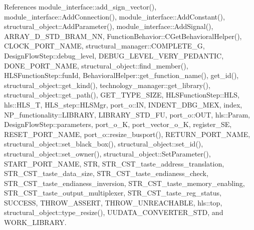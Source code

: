 References module\+\_\+interface\+::add\+\_\+sign\+\_\+vector(), module\+\_\+interface\+::\+Add\+Connection(), module\+\_\+interface\+::\+Add\+Constant(), structural\+\_\+object\+::\+Add\+Parameter(), module\+\_\+interface\+::\+Add\+Signal(), A\+R\+R\+A\+Y\+\_\+D\+\_\+\+S\+T\+D\+\_\+\+B\+R\+A\+M\+\_\+\+NN, Function\+Behavior\+::\+C\+Get\+Behavioral\+Helper(), C\+L\+O\+C\+K\+\_\+\+P\+O\+R\+T\+\_\+\+N\+A\+ME, structural\+\_\+manager\+::\+C\+O\+M\+P\+L\+E\+T\+E\+\_\+G, Design\+Flow\+Step\+::debug\+\_\+level, D\+E\+B\+U\+G\+\_\+\+L\+E\+V\+E\+L\+\_\+\+V\+E\+R\+Y\+\_\+\+P\+E\+D\+A\+N\+T\+IC, D\+O\+N\+E\+\_\+\+P\+O\+R\+T\+\_\+\+N\+A\+ME, structural\+\_\+object\+::find\+\_\+member(), H\+L\+S\+Function\+Step\+::fun\+Id, Behavioral\+Helper\+::get\+\_\+function\+\_\+name(), get\+\_\+id(), structural\+\_\+object\+::get\+\_\+kind(), technology\+\_\+manager\+::get\+\_\+library(), structural\+\_\+object\+::get\+\_\+path(), G\+E\+T\+\_\+\+T\+Y\+P\+E\+\_\+\+S\+I\+ZE, H\+L\+S\+Function\+Step\+::\+H\+LS, hls\+::\+H\+L\+S\+\_\+T, H\+L\+S\+\_\+step\+::\+H\+L\+S\+Mgr, port\+\_\+o\+::\+IN, I\+N\+D\+E\+N\+T\+\_\+\+D\+B\+G\+\_\+\+M\+EX, index, N\+P\+\_\+functionality\+::\+L\+I\+B\+R\+A\+RY, L\+I\+B\+R\+A\+R\+Y\+\_\+\+S\+T\+D\+\_\+\+FU, port\+\_\+o\+::\+O\+UT, hls\+::\+Param, Design\+Flow\+Step\+::parameters, port\+\_\+o\+\_\+K, port\+\_\+vector\+\_\+o\+\_\+K, register\+\_\+\+SE, R\+E\+S\+E\+T\+\_\+\+P\+O\+R\+T\+\_\+\+N\+A\+ME, port\+\_\+o\+::resize\+\_\+busport(), R\+E\+T\+U\+R\+N\+\_\+\+P\+O\+R\+T\+\_\+\+N\+A\+ME, structural\+\_\+object\+::set\+\_\+black\+\_\+box(), structural\+\_\+object\+::set\+\_\+id(), structural\+\_\+object\+::set\+\_\+owner(), structural\+\_\+object\+::\+Set\+Parameter(), S\+T\+A\+R\+T\+\_\+\+P\+O\+R\+T\+\_\+\+N\+A\+ME, S\+TR, S\+T\+R\+\_\+\+C\+S\+T\+\_\+taste\+\_\+address\+\_\+translation, S\+T\+R\+\_\+\+C\+S\+T\+\_\+taste\+\_\+data\+\_\+size, S\+T\+R\+\_\+\+C\+S\+T\+\_\+taste\+\_\+endianess\+\_\+check, S\+T\+R\+\_\+\+C\+S\+T\+\_\+taste\+\_\+endianess\+\_\+inversion, S\+T\+R\+\_\+\+C\+S\+T\+\_\+taste\+\_\+memory\+\_\+enabling, S\+T\+R\+\_\+\+C\+S\+T\+\_\+taste\+\_\+output\+\_\+multiplexer, S\+T\+R\+\_\+\+C\+S\+T\+\_\+taste\+\_\+reg\+\_\+status, S\+U\+C\+C\+E\+SS, T\+H\+R\+O\+W\+\_\+\+A\+S\+S\+E\+RT, T\+H\+R\+O\+W\+\_\+\+U\+N\+R\+E\+A\+C\+H\+A\+B\+LE, hls\+::top, structural\+\_\+object\+::type\+\_\+resize(), U\+U\+D\+A\+T\+A\+\_\+\+C\+O\+N\+V\+E\+R\+T\+E\+R\+\_\+\+S\+TD, and W\+O\+R\+K\+\_\+\+L\+I\+B\+R\+A\+RY.

